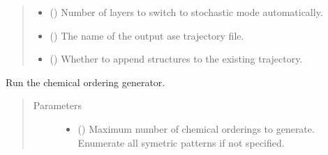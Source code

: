 \documentclass[letterpaper,10pt,english]{sphinxmanual}
\begin{document}
\begin{fulllineitems}
\begin{quote}
\begin{description}
\begin{itemize}
\item {} 
 (\sphinxstyleliteralemphasis{\sphinxupquote{, }}) \textendash{} Number of layers to switch to stochastic mode automatically.

\item {} 
 (\sphinxstyleliteralemphasis{\sphinxupquote{, }}) \textendash{} The name of the output ase trajectory file.

\item {} 
 (\sphinxstyleliteralemphasis{\sphinxupquote{, }}) \textendash{} Whether to append structures to the existing trajectory.

\end{itemize}

\end{description}\end{quote}

\begin{fulllineitems}
\label{\detokenize{build:acat.build.orderings.SymmetricOrderingGenerator.run}}
Run the chemical ordering generator.
\begin{quote}\begin{description}
\item[{Parameters}] \leavevmode\begin{itemize}
\item {} 
 (\sphinxstyleliteralemphasis{\sphinxupquote{, }}) \textendash{} Maximum number of chemical orderings to generate. Enumerate
all symetric patterns if not specified.


\end{itemize}
\end{description}
\end{quote}
\end{fulllineitems}
\end{fulllineitems}
\end{document}
